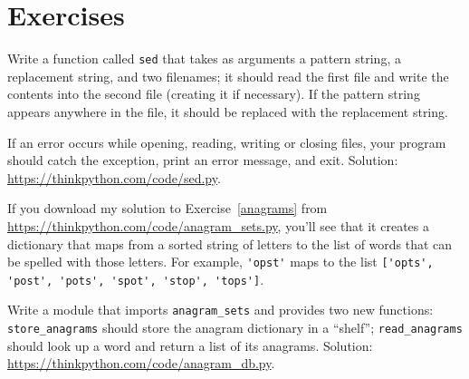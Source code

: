 \documentclass[10pt]{book}
\begin{document}
\section{Exercises}

\begin{exercise}

Write a function called {\tt sed} that takes as arguments a pattern string,
a replacement string, and two filenames; it should read the first file
and write the contents into the second file (creating it if
necessary).  If the pattern string appears anywhere in the file, it
should be replaced with the replacement string.

If an error occurs while opening, reading, writing or closing files,
your program should catch the exception, print an error message, and
exit.  Solution: \url{https://thinkpython.com/code/sed.py}.

\end{exercise}


\begin{exercise}

If you download my solution to Exercise~\ref{anagrams} from
\url{https://thinkpython.com/code/anagram_sets.py}, you'll see that it creates
a dictionary that maps from a sorted string of letters to the list of
words that can be spelled with those letters.  For example,
\verb"'opst'" maps to the list
\verb"['opts', 'post', 'pots', 'spot', 'stop', 'tops']".

Write a module that imports \verb"anagram_sets" and provides
two new functions: \verb"store_anagrams" should store the
anagram dictionary in a ``shelf''; \verb"read_anagrams" should
look up a word and return a list of its anagrams.
Solution: \url{https://thinkpython.com/code/anagram_db.py}.

\end{exercise}
\end{document}
